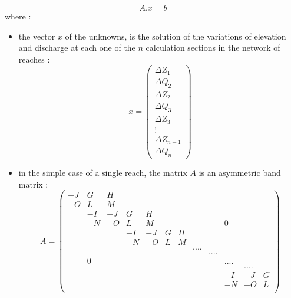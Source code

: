 \begin{equation}
 \label{eq1}
 A.x = b
\end{equation}
where :
\begin{itemize}
 \item the vector $x$ of the unknowns, is the solution of the variations of elevation and discharge at each one of the $n$ calculation sections in the network of reaches :
   \begin{equation}
      x = \left(
            \begin{array}{c}
               \Delta Z_1\\
               \Delta Q_2\\
               \Delta Z_2\\
               \Delta Q_3\\
               \Delta Z_3\\
               \vdots\\
               \Delta Z_{n-1}\\
               \Delta Q_{n}
            \end{array}
          \right)
   \end{equation}
 \item in the simple case of a single reach, the matrix $A$ is an asymmetric band matrix :
   \begin{equation}
     \label{eq3}
     A = \left(
         \begin{array}{cccccccccccc}
          -J & G & H & & & & & & & & & \\
          -O & L & M & & & & & & & & & \\
             & -I & -J & G & H & & & & & & & \\
             & -N & -O & L & M & & & &  & 0 & & \\
             & & & -I & -J & G & H & & & & & \\
             & & & -N & -O & L & M & & & & & \\
             & & & & & & & .... & & & & \\
             & & & & & & & & .... & & & \\
             & 0 & & & & & & & & .... & & \\
             & & & & & & & & & & .... & \\
             & & & & & & & & & -I & -J & G \\
             & & & & & & & & & -N & -O & L \\
         \end{array}
         \right)

\end{equation}
\end{itemize}
